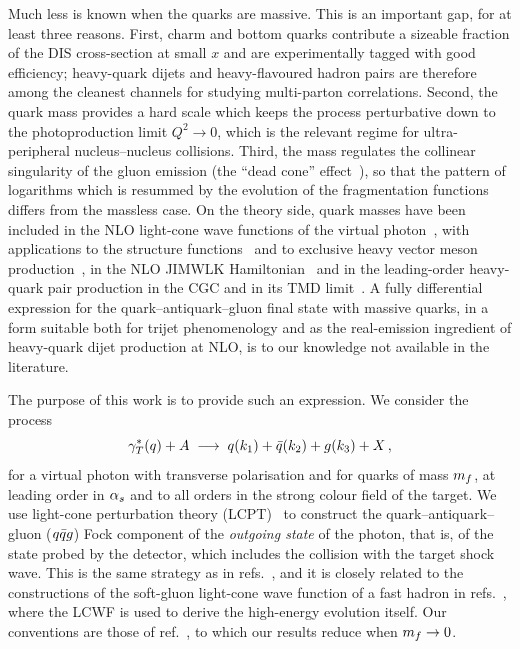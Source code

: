 Much less is known when the quarks are massive. This is an important gap, for at least three reasons.
First, charm and bottom quarks contribute a sizeable fraction of the DIS cross-section at small $x$ and
are experimentally tagged with good efficiency; heavy-quark dijets and heavy-flavoured hadron pairs are
therefore among the cleanest channels for studying multi-parton correlations. Second, the quark mass
provides a hard scale which keeps the process perturbative down to the photoproduction limit
$Q^2\to 0$, which is the relevant regime for ultra-peripheral nucleus--nucleus collisions. Third, the
mass regulates the collinear singularity of the gluon emission (the ``dead cone''
effect~\cite{Dokshitzer:1991fd}), so that the pattern of logarithms which is resummed by the evolution
of the fragmentation functions differs from the massless case. On the theory side, quark masses have
been included in the NLO light-cone wave functions of the virtual
photon~\cite{Beuf:2021qqa,Beuf:2021srj,Beuf:2022ndu}, with applications to the structure
functions~\cite{Hanninen:2022gje} and to exclusive heavy vector meson
production~\cite{Mantysaari:2021ryb,Mantysaari:2022kdm}, in the NLO JIMWLK Hamiltonian~\cite{Dai:2022imf}
and in the leading-order heavy-quark pair production in the CGC and in its TMD
limit~\cite{Marquet:2017xwy,Altinoluk:2021ygv}. A fully differential expression for the
quark--antiquark--gluon final state with massive quarks, in a form suitable both for trijet
phenomenology and as the real-emission ingredient of heavy-quark dijet production at NLO, is to our
knowledge not available in the literature.

The purpose of this work is to provide such an expression. We consider the process
\begin{equation}
\gamma^{*}_{T}(q)+A\;\longrightarrow\; q(k_1)+\bar q(k_2)+g(k_3)+X\,,
\label{eq:process}
\end{equation}
for a virtual photon with transverse polarisation and for quarks of mass $m_f$, at leading order in
$\alpha_s$ and to all orders in the strong colour field of the target. We use light-cone perturbation theory
(LCPT)~\cite{Kogut:1969xa,Bjorken:1970ah,Lepage:1980fj,Brodsky:1997de} to construct the
quark--antiquark--gluon ($q\bar q g$) Fock component of the \emph{outgoing state} of the photon, that is, of
the state probed by the detector, which includes the collision with the target shock wave. This is the
same strategy as in refs.~\cite{Iancu:2018hwa,Iancu:2020mos,Iancu:2022gpw}, and it is closely related to
the constructions of the soft-gluon light-cone wave function of a fast hadron in
refs.~\cite{Lublinsky:2016meo,Radhakrishnan:2026}, where the LCWF is used to derive the high-energy
evolution itself. Our conventions are those of ref.~\cite{Iancu:2022gpw}, to which our results reduce
when $m_f\to 0$.

